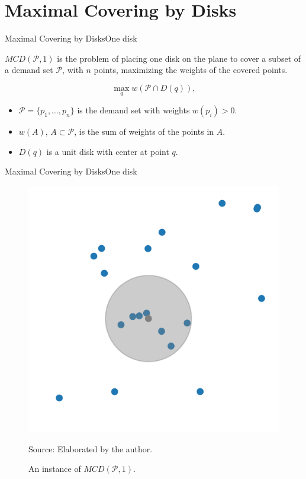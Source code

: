 \documentclass{beamer}
\newcommand{\Pp}{\mathscr{P}}
\newcommand{\bigO}{\mathscr{O}}
\newcommand{\source}[1]{\caption*{Source: {#1}} }
\begin{document}





\section{Maximal Covering by Disks}
\begin{frame}{Maximal Covering by Disks}{One disk}
	
	$MCD(\Pp, 1)$ is the problem of placing one disk on the plane to cover a subset of a demand set $\Pp$, with $n$ points, maximizing the weights of the covered points.
	
	\begin{equation*}\label{eq:max_one_disk}
		\max_q w(\Pp \cap D(q)),
	\end{equation*}
	
	\begin{itemize}
		\item $\Pp=\{p_1,\dots,p_n\}$ is the demand set with weights $w(p_i)>0$.
		\item $w(A)$, $A\subset \Pp$, is the sum of weights of the points in $A$.
		\item $D(q)$ is a unit disk with center at point $q$.
	\end{itemize}
\end{frame}

\begin{frame}{Maximal Covering by Disks}{One disk}
\begin{figure}
	\caption{An instance of $MCD(\Pp,1)$.}
	\includegraphics[scale=0.6]{figures/mcd_one_disk.pdf}
	\source{Elaborated by the author.}
\end{figure}
\end{frame}
\end{document}

